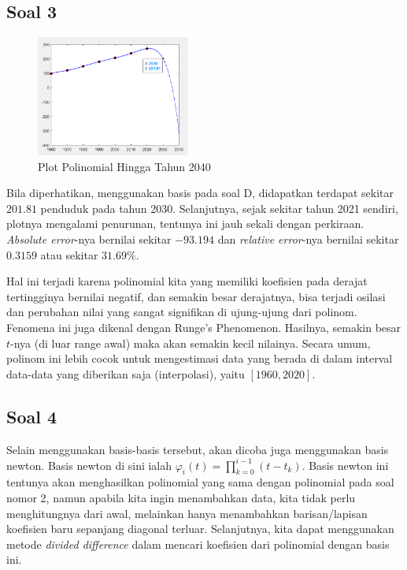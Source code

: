 \documentclass[11pt, a4paper, onecolumn, oneside, final]{report}
\begin{document}
\subsection*{Soal 3}

\begin{figure}[h!]
    \centering
    \includegraphics[width=0.45\textwidth]{assets/Plot2.png}
    \caption{Plot Polinomial Hingga Tahun 2040}
\end{figure}

Bila diperhatikan, menggunakan basis pada soal D, didapatkan terdapat sekitar $201.81$ penduduk pada tahun 2030. Selanjutnya, sejak sekitar tahun 2021 sendiri, plotnya mengalami penurunan, tentunya ini jauh sekali dengan perkiraan. \textit{Absolute error}-nya bernilai sekitar $-93.194$ dan \textit{relative error}-nya bernilai sekitar $0.3159$ atau sekitar $31.69\%$.

Hal ini terjadi karena polinomial kita yang memiliki koefisien pada derajat tertingginya bernilai negatif, dan semakin besar derajatnya, bisa terjadi osilasi dan perubahan nilai yang sangat signifikan di ujung-ujung dari polinom. Fenomena ini juga dikenal dengan Runge's Phenomenon. Hasilnya, semakin besar $t$-nya (di luar range awal) maka akan semakin kecil nilainya. Secara umum, polinom ini lebih cocok untuk mengestimasi data yang berada di dalam interval data-data yang diberikan saja (interpolasi), yaitu $[1960, 2020]$.

\subsection*{Soal 4}

Selain menggunakan basis-basis tersebut, akan dicoba juga menggunakan basis newton. Basis newton di sini ialah $\varphi_i(t) = \prod_{k = 0}^{i-1} (t - t_k)$. Basis newton ini tentunya akan menghasilkan polinomial yang sama dengan polinomial pada soal nomor 2, namun apabila kita ingin menambahkan data, kita tidak perlu menghitungnya dari awal, melainkan hanya menambahkan barisan/lapisan koefisien baru sepanjang diagonal terluar. Selanjutnya, kita dapat menggunakan metode \textit{divided difference} dalam mencari koefisien dari polinomial dengan basis ini. 
\end{document}
